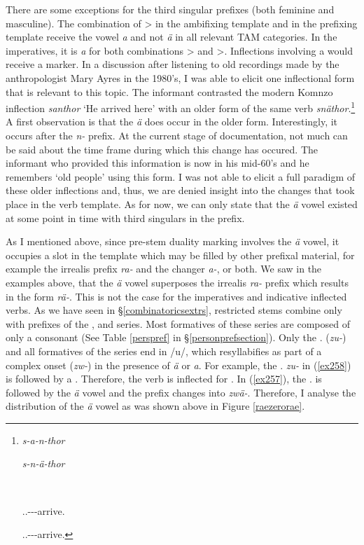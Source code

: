 There are some exceptions for the third singular prefixes (both feminine and masculine). The combination of \Sg>\Tsg{} in the ambifixing template and \Tsg{} in the prefixing template receive the vowel \emph{a} and not \emph{ä} in all relevant TAM categories. In the imperatives, it is \emph{a} for both combinations \Sg>\Tsg{} and \Pl>\Tsg{}. Inflections involving a   would receive a  marker. In a discussion after listening to old recordings made by the anthropologist Mary Ayres in the 1980's, I was able to elicit one inflectional form that is relevant to this topic. The informant contrasted the modern Komnzo inflection \emph{santhor} `He arrived here' with an older form of the same verb \emph{snäthor}.\footnote{\parbox{0.02cm}{\hfill}\parbox{6cm}{\emph{s-a-n-thor}} \parbox{5cm}{\emph{s-n-ä-thor}}\\ \parbox{0.1cm}{\hfill}\parbox{6cm}{\Tsg.\Masc.\Gam-\Ndu-\Venit-arrive.\Rs{}}  \parbox{15cm}{\Tsg.\Masc.\Gam-\Venit-\Ndu-arrive.\Rs}} A first observation is that the \emph{ä} does occur in the older form. Interestingly, it occurs after the  \emph{n-} prefix. At the current stage of documentation, not much can be said about the time frame during which this change has occured. The informant who provided this information is now in his mid-60's and he remembers `old people' using this form. I was not able to elicit a full paradigm of these older inflections and, thus, we are denied insight into the changes that took place in the verb template. As for now, we can only state that the  \emph{ä} vowel existed at some point in time with third singulars in the prefix.%

As I mentioned above, since pre-stem duality marking involves the \emph{ä} vowel, it occupies a slot in the template which may be filled by other prefixal material, for example the irrealis prefix \emph{ra-} and the  changer \emph{a-}, or both. We saw in the examples above, that the  \emph{ä} vowel superposes the irrealis \emph{ra-} prefix which results in the form \emph{rä-}. This is not the case for the imperatives and indicative inflected verbs. As we have seen in \S{}\ref{combinatoricsextrs}, restricted stems combine only with prefixes of the \Bet{}, \Betatwo{} and \Gam{} series. Most formatives of these series are composed of only a consonant (See Table \ref{perspref} in \S{}\ref{personprefsection}). Only the \Fsg.\Gam{} (\emph{zu-}) and all formatives of the \Betatwo{} series end in /u/, which resyllabifies as part of a complex onset (\emph{zw-}) in the presence of \emph{ä} or \emph{a}. For example, the \Fsg.\Gam{} \emph{zu-} in (\ref{ex258}) is followed by a . Therefore, the verb is inflected for . In (\ref{ex257}), the \Fsg.\Gam{} is followed by the  \emph{ä} vowel and the prefix changes into \emph{zwä-}. Therefore, I analyse the distribution of the \emph{ä} vowel as was shown above in Figure \ref{raezerorae}.

